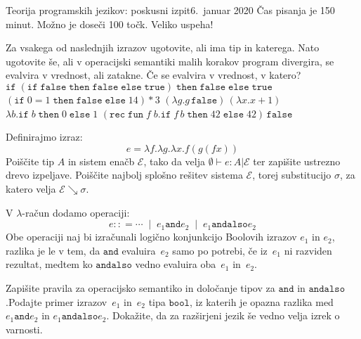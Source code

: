 \documentclass{izpit}
\begin{document}
\newcommand{\bnfis}{\mathrel{{:}{:}{=}}}
\newcommand{\bnfor}{\;\mid\;}
\newcommand{\fun}[2]{\lambda #1. #2}
\newcommand{\conditional}[3]{\mathtt{if}\;#1\;\mathtt{then}\;#2\;\mathtt{else}\;#3}
\newcommand{\recfun}[3]{\mathtt{rec}\;\mathtt{fun}\;#1\;#2. #3}
\newcommand{\tru}{\mathtt{true}}
\newcommand{\fls}{\mathtt{false}}
\newcommand{\tbool}{\mathtt{bool}}
\newcommand{\tand}{\mathbin{\mathtt{and}}}
\newcommand{\tandalso}{\mathbin{\mathtt{andalso}}}

\izpit
  {Teorija programskih jezikov: poskusni izpit}{6.\ januar 2020}{
  Čas pisanja je 150 minut. Možno je doseči 100 točk. Veliko uspeha!
}


\naloga[\tocke{25}]
Za vsakega od naslednjih izrazov ugotovite, ali ima tip in katerega. Nato ugotovite še, ali v operacijski semantiki malih korakov program divergira, se evalvira v vrednost, ali zatakne. Če se evalvira v vrednost, v katero?
\podnaloga $\conditional{(\conditional{\fls}{\fls}{\tru})}{\fls}{\tru}$ \prostor
\podnaloga $(\conditional{0=1}{\fls}{14}) * 3$ \prostor
\podnaloga $(\fun{g}{g \, \fls}) \, (\fun{x}{x + 1})$ \prostor
\podnaloga $\fun{b}{\conditional{b}{0}{1}}$ \prostor
\podnaloga $(\recfun{f}{b}{\conditional{f \, b}{42}{42}}) \, \fls$ \prostor


\naloga[\tocke{25}]
Definirajmo izraz:
\[
  e = \fun{f}{\fun{g}{\fun{x}{f(g(f x))}}}
\]
\podnaloga Poiščite tip $A$ in sistem enačb $\mathcal{E}$, tako da velja $\emptyset \vdash e : A | \mathcal{E}$ ter zapišite ustrezno drevo izpeljave.
\prostor[3]
\podnaloga Poiščite najbolj splošno rešitev sistema $\mathcal{E}$, torej substitucijo $\sigma$, za katero velja $\mathcal{E} \searrow \sigma$.\prostor



\naloga[\tocke{25}]
V $\lambda$-račun dodamo operaciji:
\[
  e \bnfis \cdots \bnfor
  e_1 \tand e_2 \bnfor
  e_1 \tandalso e_2
\]
Obe operaciji naj bi izračunali logično konjunkcijo Boolovih izrazov $e_1$ in $e_2$, razlika je le v tem, da $\mathtt{and}$ evaluira~$e_2$ samo po potrebi, če iz~$e_1$ ni razviden rezultat, medtem ko $\mathtt{andalso}$ vedno evaluira oba~$e_1$ in~$e_2$.

\podnaloga Zapišite pravila za operacijsko semantiko in določanje tipov za $\mathtt{and}$ in $\mathtt{andalso}$.\prostor[2]
\podnaloga Podajte primer izrazov~$e_1$ in~$e_2$ tipa $\tbool$,
  iz katerih je opazna razlika med $e_1 \tand e_2$ in $e_1 \tandalso e_2$.\prostor
\podnaloga Dokažite, da za razširjeni jezik še vedno velja izrek o varnosti.\prostor[2]
\end{document}
